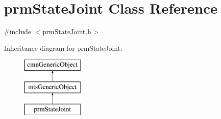 \hypertarget{classprm_state_joint}{\section{prm\-State\-Joint Class Reference}
\label{classprm_state_joint}
}


{\ttfamily \#include $<$prm\-State\-Joint.\-h$>$}

Inheritance diagram for prm\-State\-Joint\-:\begin{figure}[H]
\begin{center}
\leavevmode
\includegraphics[height=3.000000cm]{d8/d81/classprm_state_joint}
\end{center}
\end{figure}
